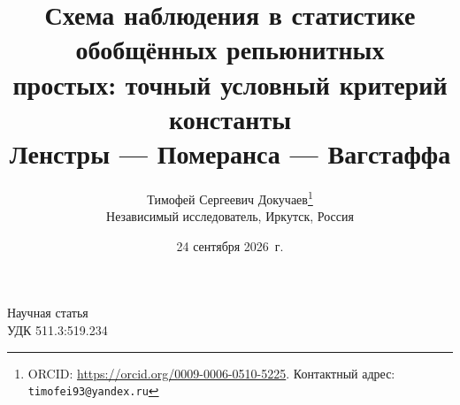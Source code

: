 \documentclass[11pt,a4paper]{article}
\title{Схема наблюдения в статистике обобщённых репьюнитных\\
простых: точный условный критерий константы\\
Ленстры --- Померанса --- Вагстаффа}
\author{Тимофей Сергеевич Докучаев\thanks{ORCID: \url{https://orcid.org/0009-0006-0510-5225}.
Контактный адрес: \texttt{timofei93@yandex.ru}}\\
\small Независимый исследователь, Иркутск, Россия}
\date{24 сентября 2026~г.}
\theoremstyle{plain}
\theoremstyle{remark}
\begin{document}
\noindent Научная статья\\
\noindent УДК 511.3:519.234
\medskip

\let\RHnewpage\newpage
\let\newpage\relax
\maketitle
\let\newpage\RHnewpage
\end{document}
